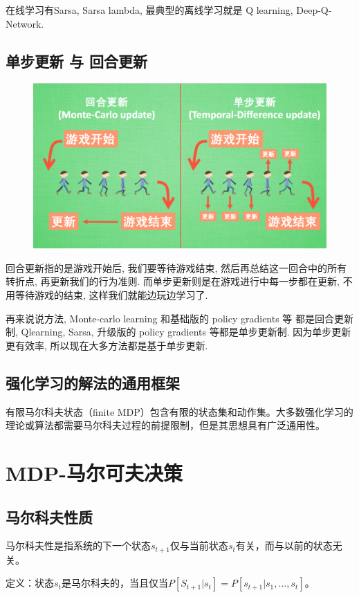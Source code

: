 \documentclass[UTF8,a4paper,12pt]{ctexbook}
\begin{document}
			在线学习有Sarsa, Sarsa lambda, 最典型的离线学习就是 Q learning, Deep-Q-Network.
			
		\subsection{单步更新 与  回合更新}
			\begin{figure}[H]
				\centering
				\includegraphics[width=.8\linewidth]{stepWithLoop}
			\end{figure}
		
			回合更新指的是游戏开始后, 我们要等待游戏结束, 然后再总结这一回合中的所有转折点, 再更新我们的行为准则. 而单步更新则是在游戏进行中每一步都在更新, 不用等待游戏的结束, 这样我们就能边玩边学习了.
			
			再来说说方法, Monte-carlo learning 和基础版的 policy gradients 等 都是回合更新制, Qlearning, Sarsa, 升级版的 policy gradients 等都是单步更新制. 因为单步更新更有效率, 所以现在大多方法都是基于单步更新. 
	
		\subsection{强化学习的解法的通用框架}
			有限马尔科夫状态（finite MDP）包含有限的状态集和动作集。大多数强化学习的理论或算法都需要马尔科夫过程的前提限制，但是其思想具有广泛通用性。
		
	\section{MDP-马尔可夫决策}
		\subsection{马尔科夫性质}
			马尔科夫性是指系统的下一个状态$s_{t+1}$仅与当前状态$s_t$有关，而与以前的状态无关。
			
			定义：状态$s_t$是马尔科夫的，当且仅当$P[S_{t+1}|s_t] = P[s_{t+1}|s_1,...,s_t]$。
			
\end{document}
